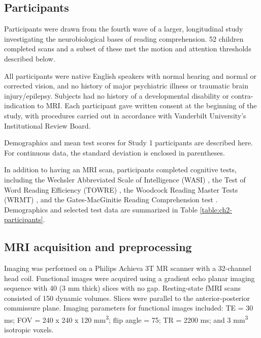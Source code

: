 \subsection{Participants}

Participants were drawn from the fourth wave of a larger, longitudinal study investigating the neurobiological bases of reading comprehension. 52 children completed scans and a subset of these met the motion and attention thresholds described below.

All participants were native English speakers with normal hearing and normal or corrected vision, and no history of major psychiatric illness or traumatic brain injury/epilepsy. Subjects had no history of a developmental disability or contra-indication to MRI.  Each participant gave written consent at the beginning of the study, with procedures carried out in accordance with Vanderbilt University’s Institutional Review Board.

\begin{table}
    \renewcommand{\tabcolsep}{0.09cm}
    \centering
    
    \caption[Participant demographics]{Demographics and mean test scores for Study 1 participants are described here. For continuous data, the standard deviation is enclosed in parentheses.}
    \label{table:ch2-participants}
\end{table}

In addition to having an MRI scan, participants completed cognitive tests, including the Wechsler Abbreviated Scale of Intelligence (WASI) \citep{Kaplan1999}, the Test of Word Reading Efficiency (TOWRE) \citep{Torgesen2012}, the Woodcock Reading Master Tests (WRMT) \citep{Woodcock1998}, and the Gates-MacGinitie Reading Comprehension test \citep{MacGinitie2000}. Demographics and selected test data are summarized in Table \ref{table:ch2-participants}.

\subsection{MRI acquisition and preprocessing}

Imaging was performed on a Philips Achieva 3T MR scanner with a 32-channel head coil. Functional images were acquired using a gradient echo planar imaging sequence with 40 (3 mm thick) slices with no gap. Resting-state fMRI scans consisted of 150 dynamic volumes. Slices were parallel to the anterior-posterior commissure plane. Imaging parameters for functional images included: TE = 30 ms; FOV = 240 x 240 x 120 mm\textsuperscript{3}; flip angle = 75\degree; TR = 2200 ms; and 3 mm\textsuperscript{3} isotropic voxels.

